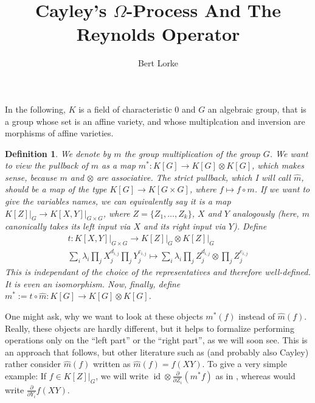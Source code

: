 \message{ !name(roughdraft.tex)}\documentclass{article}
\title{Cayley's $\Omega$-Process And The Reynolds Operator}
\author{Bert Lorke}
\theoremstyle{prrt}
\newtheorem{definition}[theorem]{Definition}
\begin{document}
In the following, $K$ is a field of characteristic $0$ and $G$ an algebraic group, that is a group whose set is an affine variety, and whose multiplcation and inversion are morphisms of affine varieties.

\begin{definition}
We denote by $m$ the group multiplication of the group $G$.
We want to view the pullback of $m$ as a map $m^\ast : K[G] \longrightarrow K[G] \otimes K[G]$, which makes sense, because $m$ and $\otimes$ are associative.
The strict pullback, which I will call $ \hat{m} $, should be a map of the type $ K[G] \longrightarrow K[ G \times G] $, where $ f \mapsto f \circ m $.
If we want to give the variables names, we can equivalently say it is a map $ \left. K[Z] \right|_G \longrightarrow \left. K[X,Y] \right|_{G \times G} $, where $ Z = \lbrace Z_1 , \ldots , Z_k \rbrace $, $X$ and $Y$ analogously (here, $ m $ canonically takes its left input via $ X $ and its right input via $ Y $).
Define
\begin{equation}
  \begin{aligned}
   t \colon \left. K \left\lbrack X , Y \right\rbrack \right|_{G \times G} \longrightarrow \left. K \left\lbrack Z \right\rbrack \right|_G \otimes \left. K\left\lbrack Z \right\rbrack \right|_G \\
    \sum_i \lambda_i \prod_j X_{j}^{d_{i,j}} \prod_j Y_{j}^{e_{i,j}} \mapsto \sum_i \lambda_i \prod_j Z_{j}^{d_{i,j}} \otimes \prod_j Z_{j}^{e_{i,j}} 
  \end{aligned}
\end{equation}
This is independant of the choice of the representatives and therefore well-defined.
It is even an isomorphism.
Now, finally, define $m^\ast := t \circ \hat{m} : K[G] \longrightarrow K[G] \otimes K[G]$.
\end{definition}


One might ask, why we want to look at these objects $ m^\ast \left( f \right) $ instead of $ \hat{m} \left( f \right) $.
Really, these objects are hardly different, but it helps to formalize performing operations only on the ``left part'' or the ``right part'', as we will soon see.
This is an approach that \cite{DK15} follows, but other literature such as \cite{St08} (and probably also Cayley) rather consider $ \hat{m} \left( f \right) $ written as $ \hat{m} \left( f \right) = f (XY) $.
To give a very simple example:
If $f \in \left. K[Z] \right|_G$, we will write $\operatorname{id} \otimes \frac{\partial}{\partial Z_i} (m^\ast f)$ as in \cite{DK15}, whereas \cite{St08} would write $\frac{\partial}{\partial Y_i} f(XY)$.
\end{document}
